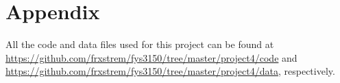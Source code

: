 \documentclass[12pt,a4paper]{article}
\begin{document}
\appendix
\section{Appendix}

All the code and data files used for this project can be found at \url{https://github.com/frxstrem/fys3150/tree/master/project4/code} and \url{https://github.com/frxstrem/fys3150/tree/master/project4/data}, respectively.
\end{document}
